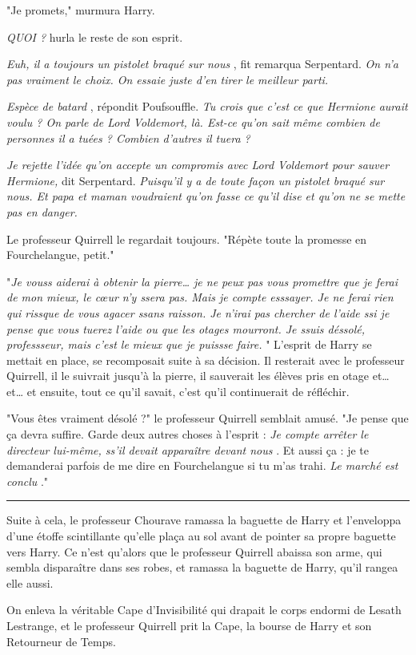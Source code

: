 "Je promets," murmura Harry.

\emph{QUOI ?}  hurla le reste de son esprit.

\emph{Euh, il a toujours un pistolet braqué sur nous} , fit remarqua Serpentard. \emph{On n'a pas vraiment le choix. On essaie juste d'en tirer le meilleur parti.} 

\emph{Espèce de batard} , répondit Poufsouffle. \emph{Tu crois que c'est ce que Hermione aurait voulu ? On parle de Lord Voldemort, là. Est-ce qu'on sait même combien de personnes il a tuées ? Combien d'autres il tuera ?} 

\emph{Je rejette l'idée qu'on accepte un compromis avec Lord Voldemort pour sauver Hermione,}  dit Serpentard. \emph{Puisqu'il y a de toute façon un pistolet braqué sur nous. Et papa et maman voudraient qu'on fasse ce qu'il dise et qu'on ne se mette pas en danger.} 

Le professeur Quirrell le regardait toujours. "Répète toute la promesse en Fourchelangue, petit."

"\emph{Je vouss aiderai à obtenir la pierre… je ne peux pas vous promettre que je ferai de mon mieux, le cœur n'y ssera pas. Mais je compte esssayer. Je ne ferai rien qui rissque de vous agacer ssans raisson. Je n'irai pas chercher de l'aide ssi je pense que vous tuerez l'aide ou que les otages mourront. Je ssuis déssolé, professseur, mais c'est le mieux que je puissse faire.} " L'esprit de Harry se mettait en place, se recomposait suite à sa décision. Il resterait avec le professeur Quirrell, il le suivrait jusqu'à la pierre, il sauverait les élèves pris en otage et… et… et ensuite, tout ce qu'il savait, c'est qu'il continuerait de réfléchir.

"Vous êtes vraiment désolé ?" le professeur Quirrell semblait amusé. "Je pense que ça devra suffire. Garde deux autres choses à l'esprit : \emph{Je compte arrêter le directeur lui-même, ss'il devait apparaître devant nous} . Et aussi ça : je te demanderai parfois de me dire en Fourchelangue si tu m'as trahi. \emph{Le marché est conclu} ."
\par\noindent\rule{\textwidth}{0.4pt}
Suite à cela, le professeur Chourave ramassa la baguette de Harry et l'enveloppa d'une étoffe scintillante qu'elle plaça au sol avant de pointer sa propre baguette vers Harry. Ce n'est qu'alors que le professeur Quirrell abaissa son arme, qui sembla disparaître dans ses robes, et ramassa la baguette de Harry, qu'il rangea elle aussi.

On enleva la véritable Cape d'Invisibilité qui drapait le corps endormi de Lesath Lestrange, et le professeur Quirrell prit la Cape, la bourse de Harry et son Retourneur de Temps.

